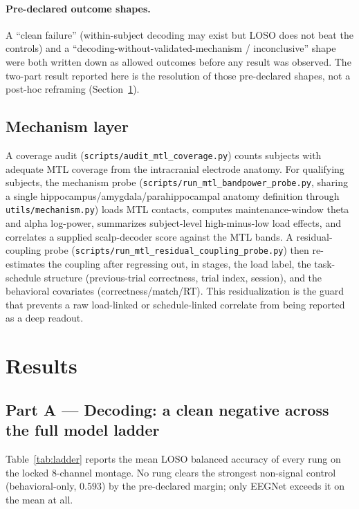 \documentclass[11pt]{article}
\begin{document}
\paragraph{Pre-declared outcome shapes.} A ``clean failure'' (within-subject decoding may exist but
LOSO does not beat the controls) and a ``decoding-without-validated-mechanism / inconclusive''
shape were both written down as allowed outcomes before any result was observed. The two-part
result reported here is the resolution of those pre-declared shapes, not a post-hoc reframing
(Section~\ref{sec:results}).

\subsection{Mechanism layer}
\label{sec:methods-mech}
A coverage audit (\texttt{scripts/audit\_mtl\_coverage.py}) counts subjects with adequate MTL
coverage from the intracranial electrode anatomy. For qualifying subjects, the mechanism probe
(\texttt{scripts/run\_mtl\_bandpower\_probe.py}, sharing a single hippocampus/amygdala/parahippocampal
anatomy definition through \texttt{utils/mechanism.py}) loads MTL contacts, computes
maintenance-window theta and alpha log-power, summarizes subject-level high-minus-low load effects,
and correlates a supplied scalp-decoder score against the MTL bands. A residual-coupling probe
(\texttt{scripts/run\_mtl\_residual\_coupling\_probe.py}) then re-estimates the coupling after
regressing out, in stages, the load label, the task-schedule structure (previous-trial correctness,
trial index, session), and the behavioral covariates (correctness/match/RT). This residualization
is the guard that prevents a raw load-linked or schedule-linked correlate from being reported as a
deep readout.

\section{Results}
\label{sec:results}

\subsection{Part A --- Decoding: a clean negative across the full model ladder}
\label{sec:resultsA}

Table~\ref{tab:ladder} reports the mean LOSO balanced accuracy of every rung on the locked
8-channel montage. No rung clears the strongest non-signal control (behavioral-only,
$0.593$) by the pre-declared margin; only EEGNet exceeds it on the mean at all.
\end{document}
